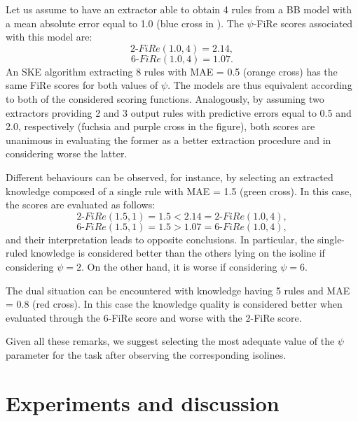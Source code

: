 \documentclass{article}
\newcommand{\fire}{FiRe}
\newcommand{\psifire}{$\psi$-\fire}
\begin{document}
Let us assume to have an extractor able to obtain 4 rules from a BB model with a mean absolute error equal to 1.0 (blue cross in ).
%
The \psifire{} scores associated with this model are:
%
\begin{equation*}
	2\textrm{-}\fire(1.0, 4)=2.14,
\end{equation*}
%
\begin{equation*}
	6\textrm{-}\fire(1.0, 4)=1.07.
\end{equation*}
%
An SKE algorithm extracting 8 rules with MAE = 0.5 (orange cross) has the same \fire{} scores for both values of $\psi$.
%
The models are thus equivalent according to both of the considered scoring functions.
%
Analogously, by assuming two extractors providing 2 and 3 output rules with predictive errors equal to 0.5 and 2.0, respectively (fuchsia and purple cross in the figure), both scores are unanimous in evaluating the former as a better extraction procedure and in considering worse the latter.

Different behaviours can be observed, for instance, by selecting an extracted knowledge composed of a single rule with MAE = 1.5 (green cross).
%
In this case, the scores are evaluated as follows:
%
\begin{equation*}
	2\textrm{-}\fire(1.5, 1)=1.5 < 2.14 = 2\textrm{-}\fire(1.0, 4),
\end{equation*}
%
\begin{equation*}
	6\textrm{-}\fire(1.5, 1)=1.5 > 1.07 = 6\textrm{-}\fire(1.0, 4),
\end{equation*}
%
and their interpretation leads to opposite conclusions.
%
In particular, the single-ruled knowledge is considered better than the others lying on the isoline if considering $\psi=2$.
%
On the other hand, it is worse if considering $\psi=6$.

The dual situation can be encountered with knowledge having 5 rules and MAE = 0.8 (red cross).
%
In this case the knowledge quality is considered better when evaluated through the 6-\fire{} score and worse with the 2-\fire{} score.

Given all these remarks, we suggest selecting the most adequate value of the $\psi$ parameter for the task after observing the corresponding isolines.

\section{Experiments and discussion}\label{sec:experiments}
\end{document}
